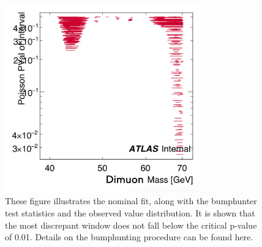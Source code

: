 \begin{figure}[!htb]
\begin{center}
        \includegraphics[width=0.75\textwidth]{figures/chapter_dimuon/NominalFit}        
        \caption{
        These figure illustrates the nominal fit, along with the bumphunter test statistics and the observed value distribution. It is shown that the most discrepant window does not fall below the critical p-value of 0.01. Details on the bumphunting procedure can be found here. 
        }
        \label{fig:dimuonstudies}
    \end{center}
\end{figure}


